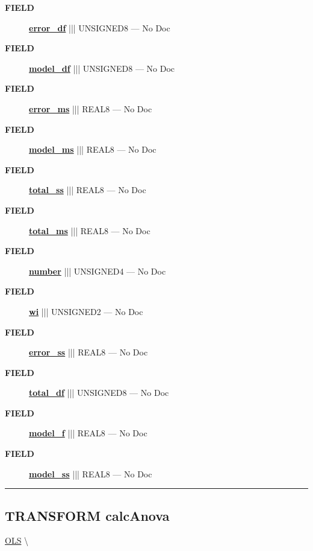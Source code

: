 \par
\begin{description}
\item [\colorbox{tagtype}{\color{white} \textbf{\textsf{FIELD}}}] \textbf{\underline{error\_df}} ||| UNSIGNED8 --- No Doc
\item [\colorbox{tagtype}{\color{white} \textbf{\textsf{FIELD}}}] \textbf{\underline{model\_df}} ||| UNSIGNED8 --- No Doc
\item [\colorbox{tagtype}{\color{white} \textbf{\textsf{FIELD}}}] \textbf{\underline{error\_ms}} ||| REAL8 --- No Doc
\item [\colorbox{tagtype}{\color{white} \textbf{\textsf{FIELD}}}] \textbf{\underline{model\_ms}} ||| REAL8 --- No Doc
\item [\colorbox{tagtype}{\color{white} \textbf{\textsf{FIELD}}}] \textbf{\underline{total\_ss}} ||| REAL8 --- No Doc
\item [\colorbox{tagtype}{\color{white} \textbf{\textsf{FIELD}}}] \textbf{\underline{total\_ms}} ||| REAL8 --- No Doc
\item [\colorbox{tagtype}{\color{white} \textbf{\textsf{FIELD}}}] \textbf{\underline{number}} ||| UNSIGNED4 --- No Doc
\item [\colorbox{tagtype}{\color{white} \textbf{\textsf{FIELD}}}] \textbf{\underline{wi}} ||| UNSIGNED2 --- No Doc
\item [\colorbox{tagtype}{\color{white} \textbf{\textsf{FIELD}}}] \textbf{\underline{error\_ss}} ||| REAL8 --- No Doc
\item [\colorbox{tagtype}{\color{white} \textbf{\textsf{FIELD}}}] \textbf{\underline{total\_df}} ||| UNSIGNED8 --- No Doc
\item [\colorbox{tagtype}{\color{white} \textbf{\textsf{FIELD}}}] \textbf{\underline{model\_f}} ||| REAL8 --- No Doc
\item [\colorbox{tagtype}{\color{white} \textbf{\textsf{FIELD}}}] \textbf{\underline{model\_ss}} ||| REAL8 --- No Doc
\end{description}





\rule{\linewidth}{0.5pt}
\subsection*{\textsf{\colorbox{headtoc}{\color{white} TRANSFORM}
calcAnova}}

\hypertarget{ecldoc:linearregression.ols.calcanova}{}
\hspace{0pt} \hyperlink{ecldoc:linearregression.ols}{OLS} \textbackslash 

